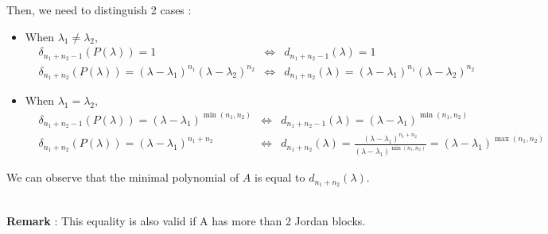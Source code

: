 \documentclass[11pt]{article}
\begin{document}
Then, we need to distinguish 2 cases : 
\begin{itemize}
\item When $\lambda_1 \neq \lambda_2$, \begin{align*}
&\delta_{n_1+n_2 - 1}(P(\lambda)) = 1  &\Leftrightarrow& d_{n_1+n_2-1}(\lambda) = 1\\
&\delta_{n_1+n_2}(P(\lambda)) = (\lambda -\lambda_{1})^{n_1}(\lambda -\lambda_{2})^{n_2} &\Leftrightarrow& d_{n_1+n_2}(\lambda) = (\lambda -\lambda_{1})^{n_1}(\lambda -\lambda_{2})^{n_2}
\end{align*}
\item When $\lambda_1 = \lambda_2$, \begin{align*}
&\delta_{n_1+n_2 - 1}(P(\lambda)) = (\lambda -\lambda_{1})^{\min(n_1,n_2)} &\Leftrightarrow& d_{n_1+n_2-1}(\lambda) = (\lambda -\lambda_{1})^{\min(n_1,n_2)}\\
&\delta_{n_1+n_2}(P(\lambda)) = (\lambda -\lambda_{1})^{n_1+n_2} &\Leftrightarrow& d_{n_1+n_2}(\lambda) = \frac{(\lambda -\lambda_{1})^{n_1+n_2}}{(\lambda -\lambda_{1})^{\min(n_1,n_2)}}=(\lambda -\lambda_{1})^{\max(n_1,n_2)}
\end{align*}
\end{itemize}

We can observe that the minimal polynomial of $A$ is equal to $d_{n_1+n_2}(\lambda)$.

~\\
\textbf{Remark} : This equality is also valid if A has more than 2 Jordan blocks.
\end{document}
